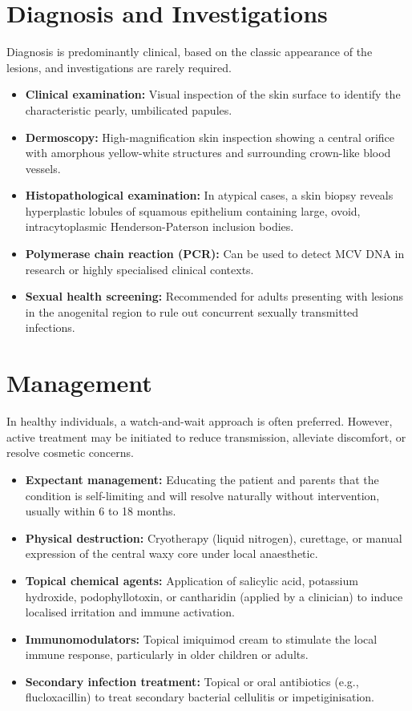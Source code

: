 \section*{Diagnosis and Investigations}
Diagnosis is predominantly clinical, based on the classic appearance of the lesions, and investigations are rarely required.
\begin{itemize}
    \item \textbf{Clinical examination:} Visual inspection of the skin surface to identify the characteristic pearly, umbilicated papules.
    \item \textbf{Dermoscopy:} High-magnification skin inspection showing a central orifice with amorphous yellow-white structures and surrounding crown-like blood vessels.
    \item \textbf{Histopathological examination:} In atypical cases, a skin biopsy reveals hyperplastic lobules of squamous epithelium containing large, ovoid, intracytoplasmic Henderson-Paterson inclusion bodies.
    \item \textbf{Polymerase chain reaction (PCR):} Can be used to detect MCV DNA in research or highly specialised clinical contexts.
    \item \textbf{Sexual health screening:} Recommended for adults presenting with lesions in the anogenital region to rule out concurrent sexually transmitted infections.
\end{itemize}

\section*{Management}
In healthy individuals, a watch-and-wait approach is often preferred. However, active treatment may be initiated to reduce transmission, alleviate discomfort, or resolve cosmetic concerns.
\begin{itemize}
    \item \textbf{Expectant management:} Educating the patient and parents that the condition is self-limiting and will resolve naturally without intervention, usually within 6 to 18 months.
    \item \textbf{Physical destruction:} Cryotherapy (liquid nitrogen), curettage, or manual expression of the central waxy core under local anaesthetic.
    \item \textbf{Topical chemical agents:} Application of salicylic acid, potassium hydroxide, podophyllotoxin, or cantharidin (applied by a clinician) to induce localised irritation and immune activation.
    \item \textbf{Immunomodulators:} Topical imiquimod cream to stimulate the local immune response, particularly in older children or adults.
    \item \textbf{Secondary infection treatment:} Topical or oral antibiotics (e.g., flucloxacillin) to treat secondary bacterial cellulitis or impetiginisation.
\end{itemize}

